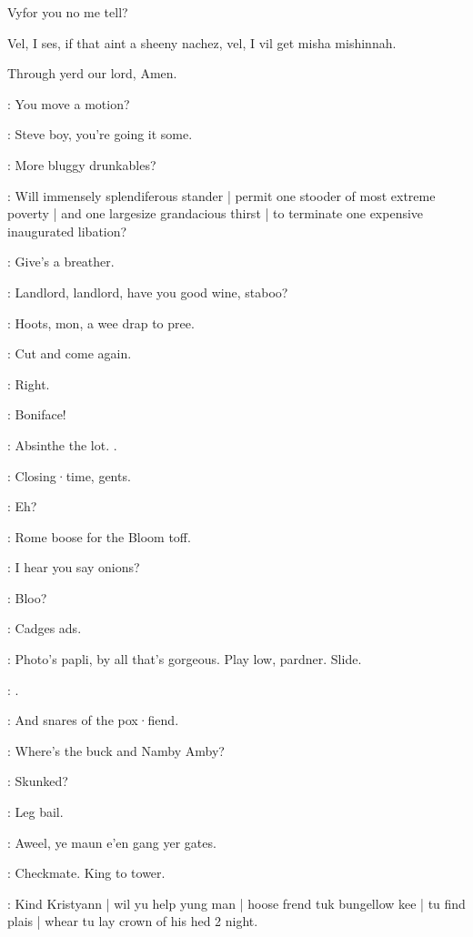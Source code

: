 \begin{omitted}
Vyfor you no me tell?

Vel,
I ses,
if that aint a sheeny nachez,
vel,
I vil get misha mishinnah.

Through yerd our lord,
Amen.
\end{omitted}


\stephen:
You move a motion?

\lenehan:
Steve boy,
you're going it some.

\dixon:
More bluggy drunkables?

\lynch:
Will immensely splendiferous stander |
permit one stooder of most extreme poverty |
and one largesize grandacious thirst |
to terminate one expensive inaugurated libation?

\crotthers:
Give's a breather.

\punch:
Landlord,
landlord,
have you good wine,
staboo?

\crotthers:
Hoots,
mon,
a wee drap to pree.

\lenehan:
Cut and come again.

\barman:
Right.

\punch:
Boniface!

\stephen:
Absinthe the lot.
.

\barman:
Closing·time,
gents.

\lenehan:
Eh?

\stephen:
Rome boose for the Bloom toff.

\lynch:
I hear you say onions?

\bannon:
Bloo?

\dixon:
Cadges ads.

\bannon:
Photo's papli,
by all that's gorgeous.
Play low,
pardner.
Slide.

\mulligan:
.


\stephen:
And snares of the pox·fiend.

\bantam:
Where's the buck and Namby Amby?

\stephen:
Skunked?

\lenehan:
Leg bail.

\crotthers:
Aweel,
ye maun e'en gang yer gates.

\stephen:
Checkmate.
King to tower.

\stephen:
Kind Kristyann |
wil yu help yung man |
hoose frend tuk bungellow kee |
tu find plais |
whear tu lay crown of his hed 2 night.

